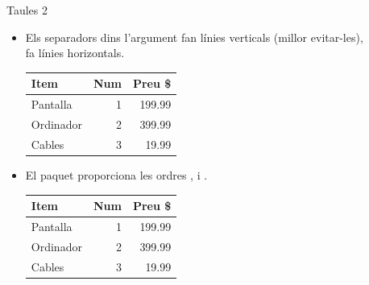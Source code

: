 \begin{frame}[fragile]{Taules 2}
\begin{itemize}
\item Els separadors \keystrokebftt{|} dins l'argument fan línies verticals (millor evitar-les),\\
 fa línies horizontals.
\begin{exampletwouptiny}
\begin{tabular}{|l|r|r|}
    \hline
    Item      & Num & Preu \$ \\
    \hline
    Pantalla  & 1   & 199.99  \\
    Ordinador & 2   & 399.99  \\
    Cables    & 3   & 19.99   \\
    \hline
\end{tabular}
\end{exampletwouptiny}
\item El paquet  proporciona les ordres ,  i .
\begin{exampletwouptiny}
\begin{tabular}{lrr}
    \toprule
    Item      & Num & Preu \$ \\
    \midrule
    Pantalla  & 1   & 199.99  \\
    Ordinador & 2   & 399.99  \\
    Cables    & 3   & 19.99   \\
    \bottomrule
\end{tabular}
\end{exampletwouptiny}
\end{itemize}
\end{frame}

